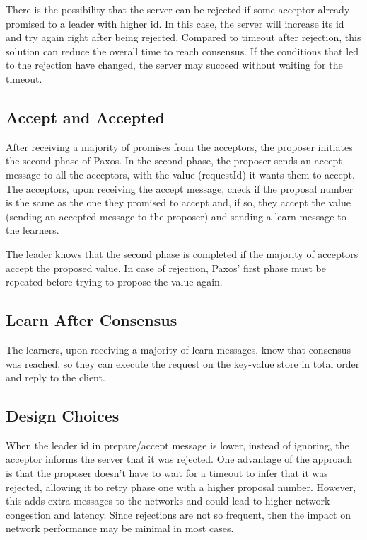 \documentclass[times, 10pt,twocolumn]{article}
\begin{document}
There is the possibility that the server can be rejected if some acceptor already promised to a leader with higher id. 
In this case, the server will increase its id and try again right after being rejected. Compared to timeout after rejection, this solution can reduce the overall time to reach consensus. If the conditions that led to the rejection have changed, the server may succeed without waiting for the timeout.

\subsection{Accept and Accepted}

After receiving a majority of promises from the acceptors, the proposer initiates the second phase of Paxos. In the second phase, the proposer sends an accept message to all the acceptors, with the value (requestId)  it wants them to accept. The acceptors, upon receiving the accept message, check if the proposal number is the same as the one they promised to accept and, if so, they accept the value (sending an accepted message to the proposer) and sending a learn message to the learners.

The leader knows that the second phase is completed if the majority of acceptors accept the proposed value. In case of rejection, Paxos' first phase must be repeated before trying to propose the value again.

\subsection{Learn After Consensus}

The learners, upon receiving a majority of learn messages, know that consensus was reached, so they can execute the request on the key-value store in total order and reply to the client.

\subsection{Design Choices}

When the leader id in prepare/accept message is lower, instead of ignoring, the acceptor informs the server that it was rejected. One advantage of the approach is that the proposer doesn't have to wait for a timeout to infer that it was rejected, allowing it to retry phase one with a higher proposal number. However, this adds extra messages to the networks and could lead to higher network congestion and latency. Since rejections are not so frequent, then the impact on network performance may be minimal in most cases.
\end{document}
